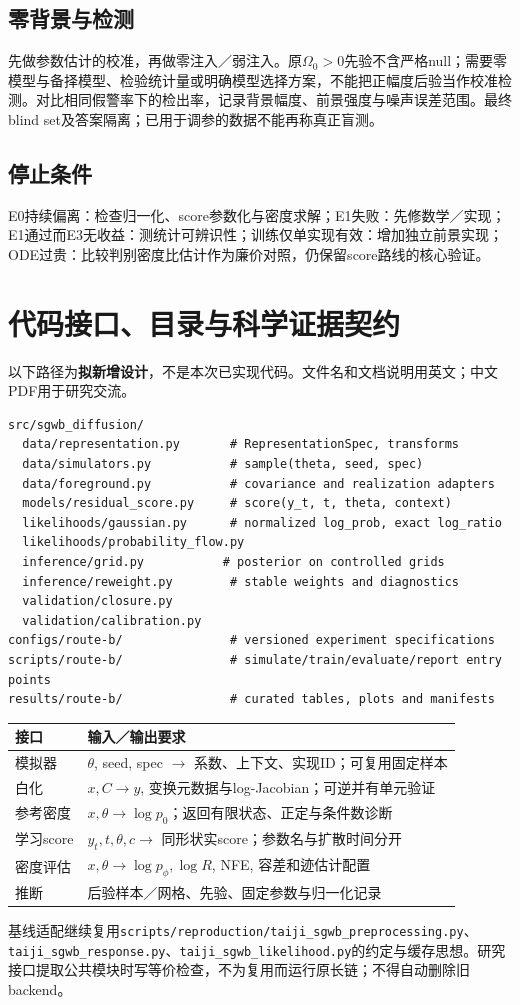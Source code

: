 \documentclass[UTF8,fontset=none,a4paper,11pt]{ctexart}
\newcommand{\code}[1]{\texttt{\nolinkurl{#1}}}
\begin{document}
\subsection{零背景与检测}
先做参数估计的校准，再做零注入／弱注入。原$\Omega_0>0$先验不含严格null；需要零模型与备择模型、检验统计量或明确模型选择方案，不能把正幅度后验当作校准检测。对比相同假警率下的检出率，记录背景幅度、前景强度与噪声误差范围。最终blind set及答案隔离；已用于调参的数据不能再称真正盲测。
\subsection{停止条件}
E0持续偏离：检查归一化、score参数化与密度求解；E1失败：先修数学／实现；E1通过而E3无收益：测统计可辨识性；训练仅单实现有效：增加独立前景实现；ODE过贵：比较判别密度比估计作为廉价对照，仍保留score路线的核心验证。
\clearpage

\section{代码接口、目录与科学证据契约}
以下路径为\textbf{拟新增设计}，不是本次已实现代码。文件名和文档说明用英文；中文PDF用于研究交流。
\begin{lstlisting}
src/sgwb_diffusion/
  data/representation.py       # RepresentationSpec, transforms
  data/simulators.py           # sample(theta, seed, spec)
  data/foreground.py           # covariance and realization adapters
  models/residual_score.py     # score(y_t, t, theta, context)
  likelihoods/gaussian.py      # normalized log_prob, exact log_ratio
  likelihoods/probability_flow.py
  inference/grid.py           # posterior on controlled grids
  inference/reweight.py        # stable weights and diagnostics
  validation/closure.py
  validation/calibration.py
configs/route-b/               # versioned experiment specifications
scripts/route-b/               # simulate/train/evaluate/report entry points
results/route-b/               # curated tables, plots and manifests
\end{lstlisting}
\par\noindent\begin{tabularx}{\linewidth}{p{31mm}Y}\toprule
接口 & 输入／输出要求\\\midrule
模拟器 & $\theta$, seed, spec $\to$ 系数、上下文、实现ID；可复用固定样本\\
白化 & $x,C\to y$, 变换元数据与log-Jacobian；可逆并有单元验证\\
参考密度 & $x,\theta\to\log p_0$；返回有限状态、正定与条件数诊断\\
学习score & $y_t,t,\theta,c\to$ 同形状实score；参数名与扩散时间分开\\
密度评估 & $x,\theta\to\log p_\phi,\log R$, NFE, 容差和迹估计配置\\
推断 & 后验样本／网格、先验、固定参数与归一化记录\\\bottomrule
\end{tabularx}\par
基线适配继续复用\code{scripts/reproduction/taiji_sgwb_preprocessing.py}、\code{taiji_sgwb_response.py}、\code{taiji_sgwb_likelihood.py}的约定与缓存思想。研究接口提取公共模块时写等价检查，不为复用而运行原长链；不得自动删除旧backend。
\clearpage
\end{document}
